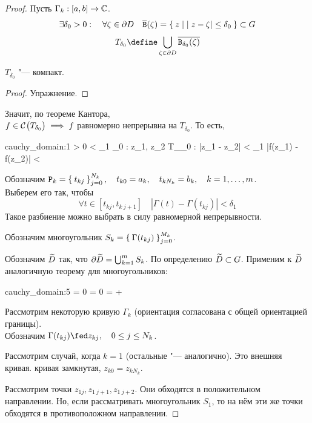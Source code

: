 \begin{proof}
	Пусть $ \Gamma_k : [a, b] \to \Co $.
	$$ \exists \delta_0 > 0 : \quad \forall \zeta \in \partial D \quad \ol{\mathtt B}(\zeta) = \set{ z \mid |z - \zeta| \le \delta_0} \sub G $$
	$$ T_{\delta_0} \define \bigcup_{\zeta \in \partial D} \ol{\mathtt B_{\delta_0}(\zeta)} $$
	\begin{statement}
		$ T_{\delta_0} $ "--- компакт.
	\end{statement}
	\begin{proof}
		Упражнение.
	\end{proof}
	Значит, по теореме Кантора, \\
	$ f \in \Cont{T_{\delta_0}} \implies f $ равномерно непрерывна на $ T_{\delta_0} $. То есть,
	\begin{equ}{cauchy_domain:1}
		\forall \eps > 0 \quad {} < \delta_1 \le \delta_0 : \quad \forall z_1, z_2 \in T_{\delta_0} : |z_1 - z_2| < \delta_1 \quad |f(z_1) - f(z_2)| < \eps
	\end{equ}
	Обозначим $ \mathtt P_k = \seqz[N_k]{t_{kj}}j, \quad t_{k0} = a_k, \quad t_{kN_k} = b_k, \quad k = 1, \dots, m $. \\
	Выберем его так, чтобы
	$$ \forall t \in [t_{kj}, t_{k~j + 1}] \quad |\Gamma(t) - \Gamma(t_{kj})| < \delta_1 $$
	Такое разбиение можно выбрать в силу равномерной непрерывности.

	Обозначим многоугольник $ S_k = \seqz[M_k]{\Gamma(t_{kj})}j $.

	Обозначим $ \vawe D $ так, что $ \partial \vawe D = \bigcup_{k = 1}^m S_k $. По определению $ \vawe D \sub G $. Применим к $ \vawe D $ аналогичную теорему для многоугольников:
	\begin{equ}{cauchy_domain:5}
		 = 0 \quad
		\implies \quad {} = 0 \quad
		\implies \quad {} =  + 
	\end{equ}
	Рассмотрим некоторую кривую $ \Gamma_k $ (ориентация согласована с общей ориентацией границы). \\
	Обозначим $ \Gamma(t_{kj}) \fed z_{kj}, \quad 0 \le j \le N_k $.

	Рассмотрим случай, когда $ k = 1 $ (остальные "--- аналогично). Это внешняя кривая. \As кривая замкнутая, $ z_{k0} = z_{kN_k} $.

	Рассмотрим точки $ z_{1j}, z_{1~j + 1}, z_{1~j + 2} $. Они обходятся в положительном направлении. Но, если рассматривать многоугольник $ S_1 $, то на нём эти же точки обходятся в противоположном направлении.


\end{proof}
